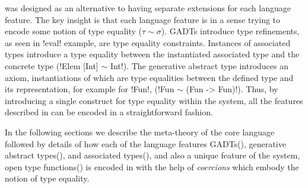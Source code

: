 \documentclass[screen,nonacm]{acmart}
\begin{document}
\SFC\cite{sulzmann_system_2007} was designed as an alternative to having separate extensions for each language feature. The key insight is that each language feature is in a sense trying to encode some notion of type equality ($\tau\sim\sigma$). GADTs introduce type refinements, as seen in !eval! example, are type equality constraints. Instances of associated types introduce a type equality between the instantiated associated type and the concrete type (!Elem [Int] $\sim$ Int!). The generative abstract type introduces an axiom, instantiations of which are type equalities between the defined type and its representation, for example for !Fun!, (!Fun $\sim$ (Fun -> Fun)!). Thus, by introducing a single construct for type equality within the system, all the features described in  can be encoded in a straightforward fashion.

In the following sections we describe the  meta-theory of the core language followed by details of how each of the language features GADTs(), generative abstract types(), and associated types(), and also a unique feature of the system, open type functions() is encoded in \SFC with the help of \emph{coercions} which embody the notion of type equality.







\end{document}
